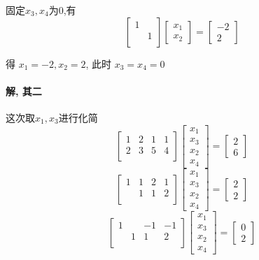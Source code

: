 \documentclass[a4paper]{article}
\begin{document}
固定$x_3,x_4$为0,有
\[
\begin{bmatrix}
    1 &  \\
     & 1 \\
\end{bmatrix}
\left[\begin{array}{c} x_1 \\ x_2  \end{array}\right] =
\left[\begin{array}{c} -2\\ 2\end{array}\right]
\]

得 $x_1 = -2, x_2 = 2$, 此时 $x_3 = x_4 = 0$

\paragraph{解, 其二}

这次取$x_1,x_3$进行化简
\[
\left[\begin{array}{cccc}
    1 &2& 1& 1\\
    2& 3& 5 & 4\\
\end{array}\right]
\left[\begin{array}{c} x_1 \\ x_3 \\ x_2 \\ x_4  \end{array}\right] =
\left[\begin{array}{c} 2\\ 6\end{array}\right]
\]
\[
\left[\begin{array}{cccc}
    1 &1& 2& 1\\
     & 1& 1 & 2\\
\end{array}\right]
\left[\begin{array}{c} x_1 \\ x_3 \\ x_2 \\ x_4  \end{array}\right] =
\left[\begin{array}{c} 2\\ 2\end{array}\right]
\]
\[
\left[\begin{array}{cccc}
    1 & & -1& -1\\
     & 1& 1 & 2\\
\end{array}\right]
\left[\begin{array}{c} x_1 \\ x_3 \\ x_2 \\ x_4  \end{array}\right] =
\left[\begin{array}{c} 0\\ 2\end{array}\right]
\]
\end{document}
